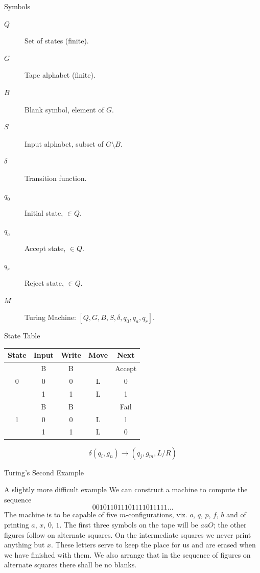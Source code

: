 \begin{frame}{Symbols}
\begin{description}
  \item[$Q$] Set of states (finite).
  \item[$G$] Tape alphabet (finite).
  \item[$B$] Blank symbol, element of $G$.
  \item[$S$] Input alphabet, subset of $G \setminus  B $.
  \item[$\delta$] Transition function.
  \item[$q_0$] Initial state, $\in Q$.
  \item[$q_a$] Accept state, $\in Q$.
  \item[$q_r$] Reject state, $\in Q$.
  \vspace{0.3cm}
  \item[$M$] Turing Machine: $[ Q, G, B, S, \delta , q_0, q_a, q_r ]$.
\end{description}
\end{frame}

\begin{frame}{State Table}
  \begin{table}
    \centering
    \begin{tabular}{cc|ccc}
      \toprule
      State	& Input	& Write & Move & Next \\
      \midrule
      \multirow{3}{*}{0} 
      & B & B &  & Accept \\
      & 0 & 0 & L & 0 \\
      & 1 & 1 & L & 1 \\
      \midrule
      \multirow{3}{*}{1}
      & B & B &  & Fail \\
      & 0 & 0 & L & 1 \\
      & 1 & 1 & L & 0 \\
      \bottomrule
    \end{tabular}
  \end{table}
  
  \[ \delta(q_i, g_n) \rightarrow (q_j, g_m, L/R) \]
\end{frame}

\begin{frame}{Turing's Second Example}
  \begin{block}{A slightly more difficult example}
    We can construct a machine to compute the sequence
    \[ 001011011101111011111 \ldots \]
    The machine is to be capable of five $m$-configurations, viz. $o$, $q$, $p$, $f$, $b$ and of printing $a$, $x$, $0$, $1$.
    The first three symbols on the tape will be $aaO$; the other figures follow on alternate squares.
    On the intermediate squares we never print anything but $x$.
    These letters serve to keep the place for us and are erased when we have finished with them.
    We also arrange that in the sequence of figures on alternate squares there shall be no blanks.
  \end{block}
\end{frame}

